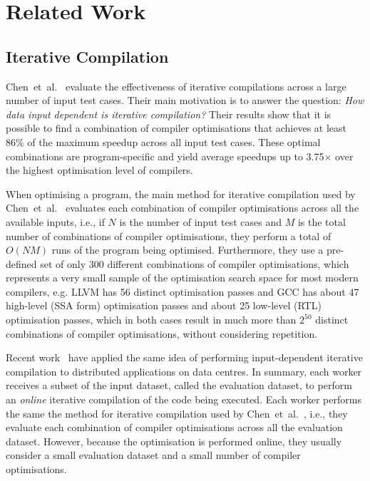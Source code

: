 \documentclass[sigplan,9pt]{acmart}
\newcommand{\etal}{et~al.}
\newcommand{\itercomp}{{iterative compilation}}
\newcommand{\IterComp}{{Iterative Compilation}}
\begin{document}
\section{Related Work}

\subsection{{\IterComp}}

Chen~\etal~\cite{chen10,chen12a} evaluate the effectiveness of iterative
compilations across a large number of input test cases.
Their main motivation is to answer the question:
\textit{How data input dependent is {\itercomp}?}
Their results show that it is possible to find a combination of compiler optimisations
that achieves at least 86\% of the maximum speedup across all input test cases.
These optimal combinations are program-specific and yield average
speedups up to 3.75$\times$ over the highest optimisation level of compilers.

When optimising a program, the main method for {\itercomp} used by Chen~\etal~\cite{chen10,chen12a}
evaluates each combination of compiler optimisations across all the available inputs, i.e.,
if $N$ is the number of input test cases and $M$ is the total number of combinations of compiler optimisations,
they perform a total of $O(NM)$ runs of the program being optimised.
Furthermore, they use a pre-defined set of only 300 different combinations of compiler optimisations,
which represents a very small sample of the optimisation search space for most modern compilers, e.g.
LLVM has 56 distinct optimisation passes and GCC has about 47 high-level (SSA form) optimisation passes and
about 25 low-level (RTL) optimisation passes, which in both cases result in much more than $2^{50}$ distinct
combinations of compiler optimisations, without considering repetition.

Recent work~\cite{chen12b,fang15} have applied the same idea of performing
input-dependent {\itercomp} to distributed applications on data centres.
In summary, each worker receives a subset of the input dataset, called the evaluation dataset,
to perform an \textit{online} {\itercomp} of the code being executed.
Each worker performs the same the method for {\itercomp} used by Chen~\etal~\cite{chen10,chen12a},
i.e., they evaluate each combination of compiler optimisations across all the evaluation dataset.
However, because the optimisation is performed online, they usually consider a small evaluation dataset
and a small number of compiler optimisations.
\end{document}
